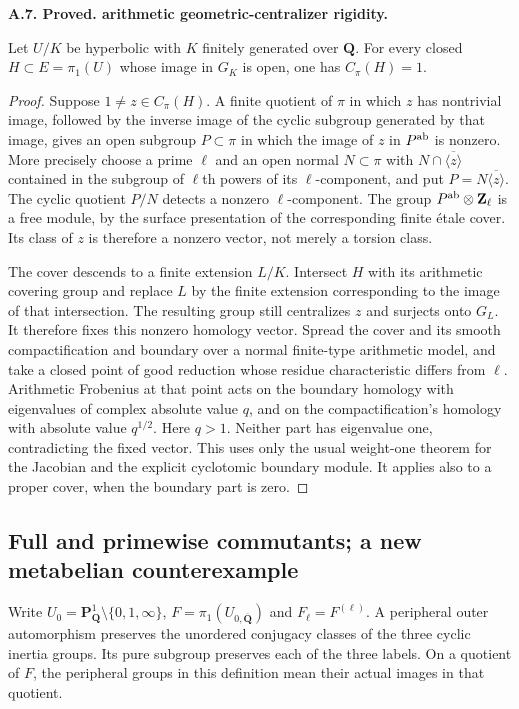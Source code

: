\documentclass[11pt,oneside]{article}
\makeatletter
\newcounter{statementanchor}
\newenvironment{statement}[3]{%
 \refstepcounter{statementanchor}\def\@currentlabel{#1}%
 \par\addvspace{9pt}\noindent
 \textbf{#1. #2. #3.}\par\nobreak\noindent\ignorespaces
}{\par\addvspace{5pt}}
\makeatother
\begin{document}
\begin{statement}{A.7}{Proved}{arithmetic geometric-centralizer rigidity}
\label{st:A.7}
\label{A:geometric-centralizer}
Let $U/K$ be hyperbolic with $K$ finitely generated over
$\mathbf Q$.  For every closed $H\subset E=\pi_1(U)$ whose image
in $G_K$ is open, one has $C_\pi(H)=1$.
\end{statement}
\begin{proof}
Suppose $1\ne z\in C_\pi(H)$.  A finite quotient of $\pi$ in
which $z$ has nontrivial image, followed by the inverse image of the
cyclic subgroup generated by that image, gives an open subgroup
$P\subset\pi$ in which the image of $z$ in $P^{\rm ab}$ is
nonzero.  More precisely choose a prime $\ell$ and an open normal
$N\subset\pi$ with $N\cap\overline{\langle z\rangle}$ contained
in the subgroup of $\ell$th powers of its $\ell$-component, and put
$P=N\overline{\langle z\rangle}$.  The cyclic quotient $P/N$
detects a nonzero $\ell$-component.  The group $P^{\rm ab}\otimes
\mathbf Z_\ell$ is a free module, by the surface presentation of
the corresponding finite \'etale cover.  Its class of $z$ is
therefore a nonzero vector, not merely a torsion class.

The cover descends to a finite extension $L/K$.  Intersect $H$ with
its arithmetic covering group and replace $L$ by the finite
extension corresponding to the image of that intersection.  The
resulting group still centralizes $z$ and surjects onto $G_L$.
It therefore fixes this nonzero homology vector.  Spread the cover
and its smooth compactification and boundary over a normal
finite-type arithmetic model, and take a closed point of good
reduction whose residue characteristic differs from $\ell$.
Arithmetic Frobenius at that point acts on the boundary homology
with eigenvalues of complex absolute value $q$, and on the
compactification's homology with absolute value $q^{1/2}$.
Here $q>1$.  Neither part has eigenvalue one, contradicting the
fixed vector.  This uses only the usual weight-one theorem for the
Jacobian and the explicit cyclotomic boundary module.  It applies
also to a proper cover, when the boundary part is zero.
\end{proof}

\subsection{Full and primewise commutants; a new metabelian counterexample}

Write $U_0=\mathbf P^1_{\mathbf Q}\setminus\{0,1,\infty\}$,
$F=\pi_1(U_{0,\overline{\mathbf Q}})$ and
$F_\ell=F^{(\ell)}$.  A peripheral outer automorphism preserves
the unordered conjugacy classes of the three cyclic inertia groups.
Its pure subgroup preserves each of the three labels.  On a quotient
of $F$, the peripheral groups in this definition mean their actual
images in that quotient.
\end{document}
